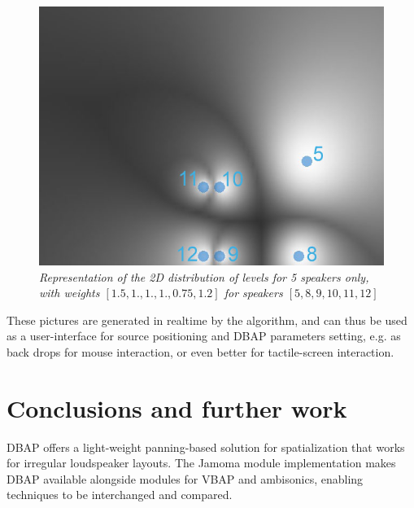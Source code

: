 \documentclass[twoside,10pt]{article}
\begin{document}
\begin{figure}[ht]
\centerline{\includegraphics[scale=0.5]{spk_groups+nbrs}}
\caption{{\it Representation of the 2D distribution of levels for 5 speakers only, with weights $[1.5,1.,1.,1.,0.75,1.2]$ for speakers $[5,8,9,10,11,12]$}}  
\label{fig:5spk_weights}
\end{figure}


These pictures are generated in realtime by the algorithm, and can thus be used as a user-interface for source positioning and DBAP parameters setting, e.g. as back drops for mouse interaction, or even better for tactile-screen interaction.



\section{Conclusions and further work}

DBAP offers a light-weight panning-based solution for spatialization that works for irregular loudspeaker layouts. The Jamoma module implementation makes DBAP available alongside modules for VBAP and ambisonics, enabling techniques to be interchanged and compared. %
\end{document}
